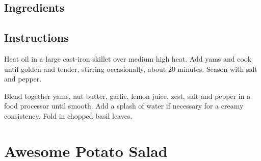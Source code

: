 \documentclass[letterpaper,10pt,english]{sphinxmanual}
\begin{document}
\section{Ingredients}
\label{\detokenize{roasted_yam_dip:ingredients}}
%
\begin{sphinxVerbatim}[commandchars=\\\{\}]
  

     

    

      

   

   

   

    
\end{sphinxVerbatim}


\section{Instructions}
\label{\detokenize{roasted_yam_dip:instructions}}
Heat oil in a large cast-iron skillet over medium high heat. Add yams and cook until golden and tender, stirring occasionally, about 20 minutes.  Season with salt and pepper.

Blend together yams, nut butter, garlic, lemon juice, zest, salt and pepper in a food processor until smooth. Add a splash of water if necessary for a creamy consistency.  Fold in chopped basil leaves.


\chapter{Awesome Potato Salad}
\label{\detokenize{Potato_Sal:awesome-potato-salad}}\label{\detokenize{Potato_Sal::doc}}
\end{document}
